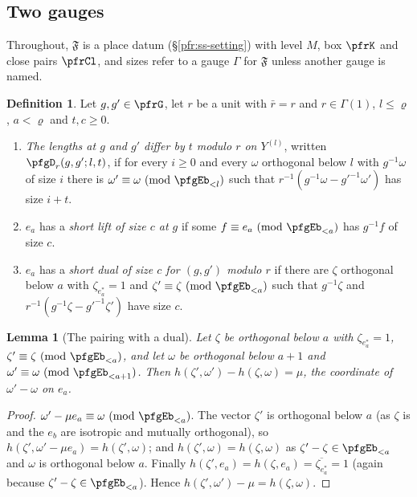 \documentclass[10pt]{amsart}
\newtheorem{lemma}[theorem]{Lemma}
\theoremstyle{definition}
\newtheorem{definition}[theorem]{Definition}
\theoremstyle{remark}
\begin{document}
\subsection{Two gauges}\label{pfg:ss-two}

Throughout, $\mathfrak F$ is a place datum (\S\ref{pfr:ss-setting}) with level $M$, box $\pfrK$ and close pairs
$\pfrCl$, and sizes refer to a gauge $\Gamma$ for $\mathfrak F$ unless another gauge is named.

\begin{definition}\label{pfg:def}
Let $g,g'\in\pfrG$, let $r$ be a unit with $\bar r=r$ and $r\in\Gamma(1)$, $l\le\varrho$, $a<\varrho$ and
$t,c\ge0$.
\begin{enumerate}
\item[(a)] \emph{The lengths at $g$ and $g'$ differ by $t$ modulo $r$ on $Y^{(l)}$}, written $\pfgD_r(g,g';l,t)$,
if for every $i\ge0$ and every $\omega$ orthogonal below $l$ with $g^{-1}\omega$ of size $i$ there is
$\omega'\equiv\omega\ (\mathrm{mod}\ \pfgEb_{<l})$ such that $r^{-1}(g^{-1}\omega-g'^{-1}\omega')$ has size
$i+t$.
\item[(b)] $e_a$ has a \emph{short lift of size $c$ at $g$} if some $f\equiv e_a\ (\mathrm{mod}\
\pfgEb_{<a})$ has $g^{-1}f$ of size $c$.
\item[(c)] $e_a$ has a \emph{short dual of size $c$ for $(g,g')$ modulo $r$} if there are $\zeta$ orthogonal
below $a$ with $\zeta_{e^*_a}=1$ and $\zeta'\equiv\zeta\ (\mathrm{mod}\ \pfgEb_{<a})$ such that $g^{-1}\zeta$ and
$r^{-1}(g^{-1}\zeta-g'^{-1}\zeta')$ have size $c$.
\end{enumerate}
\end{definition}

\begin{lemma}[The pairing with a dual]\label{pfg:pairing}
Let $\zeta$ be orthogonal below $a$ with $\zeta_{e^*_a}=1$, $\zeta'\equiv\zeta\ (\mathrm{mod}\ \pfgEb_{<a})$, and
let $\omega$ be orthogonal below $a+1$ and $\omega'\equiv\omega\ (\mathrm{mod}\ \pfgEb_{<a+1})$. Then
$h(\zeta',\omega')-h(\zeta,\omega)=\mu$, the coordinate of $\omega'-\omega$ on $e_a$.
\end{lemma}
\begin{proof}
$\omega'-\mu e_a\equiv\omega\ (\mathrm{mod}\ \pfgEb_{<a})$. The vector $\zeta'$ is orthogonal below $a$ (as
$\zeta$ is and the $e_b$ are isotropic and mutually orthogonal), so $h(\zeta',\omega'-\mu e_a)=h(\zeta',\omega)$;
and $h(\zeta',\omega)=h(\zeta,\omega)$ as $\zeta'-\zeta\in\pfgEb_{<a}$ and $\omega$ is orthogonal below $a$.
Finally $h(\zeta',e_a)=h(\zeta,e_a)=\overline{\zeta_{e^*_a}}=1$ (again because $\zeta'-\zeta\in\pfgEb_{<a}$).
Hence $h(\zeta',\omega')-\mu=h(\zeta,\omega)$.
\end{proof}
\end{document}
